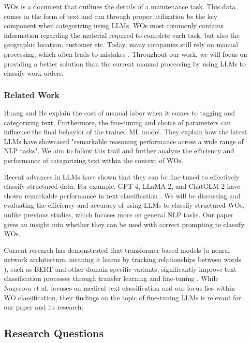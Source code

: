 WOs is a document that outlines the details of a maintenance task.
This data comes in the form of text and can through proper utilization be the
key component when categorizing using LLMs.
WOs most commonly contains information regarding the material required to
complete such task, but also the geographic location, customer etc.
Today, many companies still rely on manual processing, which often leads to
mistakes \cite{ibm2023} \cite{li2024}.
Throughout our work, we will focus on providing a better solution than the
current manual processing by using LLMs to classify work orders.

\subsubsection{Related Work}

Huang and He \cite{huang2024} explain the cost of manual labor when it comes to
tagging and categorizing text.
Furthermore, the fine-tuning and choice of parameters can influence the final
behavior of the trained ML model.
They explain how the latest LLMs have showcased "remarkable reasoning
performance across a wide range of NLP tasks".
We aim to follow this trail and further analyze the efficiency and performance
of categorizing text within the context of WOs.

\bigskip
Recent advances in LLMs have shown that they can be fine-tuned to effectively
classify structured data.
For example, GPT-4, LLaMA 2, and ChatGLM 2 have shown remarkable performance in
text classification \cite{zhang2024}.
We will be discussing and evaluating the efficiency and accuracy of using LLMs
to classify structured WOs, unlike previous studies, which focuses more on
general NLP tasks.
Our paper gives an insight into whether they can be used with correct prompting
to classify WOs.

\bigskip
Current research has demonstrated that transformer-based models
(a neural network architecture, meaning it learns by tracking relationships
between words \cite{merritt2022}),
such as BERT and other domain-specific variants, significantly improve text
classification processes through transfer learning and fine-tuning
\cite{nazyrova2024}.
While Nazyrova et al. focuses on medical text classification and our focus lies
within WO classification, their findings on the topic of fine-tuning LLMs is
relevant for our paper and its research.

\subsection{Research Questions}

